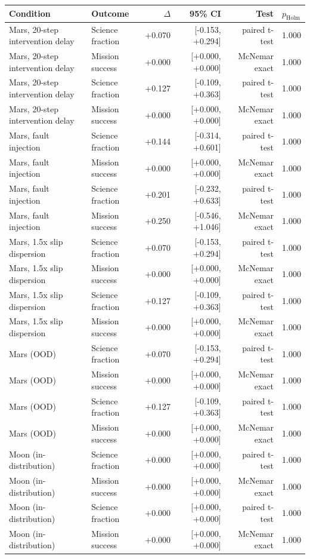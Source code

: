 \begin{tabular}{llrrrl}
\toprule
Condition & Outcome & $\Delta$ & 95\% CI & Test & $p_{\mathrm{Holm}}$ \\
\midrule
Mars, 20-step intervention delay & Science fraction & +0.070 & [-0.153, +0.294] & paired t-test & 1.000 \\
Mars, 20-step intervention delay & Mission success & +0.000 & [+0.000, +0.000] & McNemar exact & 1.000 \\
Mars, 20-step intervention delay & Science fraction & +0.127 & [-0.109, +0.363] & paired t-test & 1.000 \\
Mars, 20-step intervention delay & Mission success & +0.000 & [+0.000, +0.000] & McNemar exact & 1.000 \\
Mars, fault injection & Science fraction & +0.144 & [-0.314, +0.601] & paired t-test & 1.000 \\
Mars, fault injection & Mission success & +0.000 & [+0.000, +0.000] & McNemar exact & 1.000 \\
Mars, fault injection & Science fraction & +0.201 & [-0.232, +0.633] & paired t-test & 1.000 \\
Mars, fault injection & Mission success & +0.250 & [-0.546, +1.046] & McNemar exact & 1.000 \\
Mars, 1.5x slip dispersion & Science fraction & +0.070 & [-0.153, +0.294] & paired t-test & 1.000 \\
Mars, 1.5x slip dispersion & Mission success & +0.000 & [+0.000, +0.000] & McNemar exact & 1.000 \\
Mars, 1.5x slip dispersion & Science fraction & +0.127 & [-0.109, +0.363] & paired t-test & 1.000 \\
Mars, 1.5x slip dispersion & Mission success & +0.000 & [+0.000, +0.000] & McNemar exact & 1.000 \\
Mars (OOD) & Science fraction & +0.070 & [-0.153, +0.294] & paired t-test & 1.000 \\
Mars (OOD) & Mission success & +0.000 & [+0.000, +0.000] & McNemar exact & 1.000 \\
Mars (OOD) & Science fraction & +0.127 & [-0.109, +0.363] & paired t-test & 1.000 \\
Mars (OOD) & Mission success & +0.000 & [+0.000, +0.000] & McNemar exact & 1.000 \\
Moon (in-distribution) & Science fraction & +0.000 & [+0.000, +0.000] & paired t-test & 1.000 \\
Moon (in-distribution) & Mission success & +0.000 & [+0.000, +0.000] & McNemar exact & 1.000 \\
Moon (in-distribution) & Science fraction & +0.000 & [+0.000, +0.000] & paired t-test & 1.000 \\
Moon (in-distribution) & Mission success & +0.000 & [+0.000, +0.000] & McNemar exact & 1.000 \\
\bottomrule
\end{tabular}
